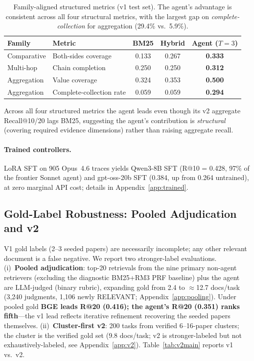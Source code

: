 \documentclass{article}
\begin{document}
\begin{table}[t]
\centering
\caption{Family-aligned structured metrics (v1 test set). The agent's advantage is consistent across all four structural metrics, with the largest gap on \emph{complete-collection} for aggregation (29.4\% vs.\ 5.9\%).}
\label{tab:familystruct}
\small
\begin{tabular}{llccc}
\toprule
\textbf{Family} & \textbf{Metric} & \textbf{BM25} & \textbf{Hybrid} & \textbf{Agent ($T{=}3$)} \\
\midrule
Comparative  & Both-sides coverage      & 0.133 & 0.267 & \textbf{0.333} \\
Multi-hop    & Chain completion         & 0.250 & 0.250 & \textbf{0.312} \\
Aggregation  & Value coverage           & 0.324 & 0.353 & \textbf{0.500} \\
Aggregation  & Complete-collection rate & 0.059 & 0.059 & \textbf{0.294} \\
\bottomrule
\end{tabular}
\end{table}

Across all four structured metrics the agent leads even though its v2 aggregate Recall@10/20 lags BM25, suggesting the agent's contribution is \emph{structural} (covering required evidence dimensions) rather than raising aggregate recall.

\paragraph{Trained controllers.} LoRA SFT on 905 Opus~4.6 traces yields Qwen3-8B SFT (R@10 = 0.428, 97\% of the frontier Sonnet agent) and gpt-oss-20b SFT (0.384, up from 0.264 untrained), at zero marginal API cost; details in Appendix~\ref{app:trained}.

\subsection{Gold-Label Robustness: Pooled Adjudication and v2}
\label{sec:goldrobust}

V1 gold labels (2--3 seeded papers) are necessarily incomplete; any other relevant document is a false negative. We report two stronger-label evaluations. (i)~\textbf{Pooled adjudication}: top-20 retrievals from the nine primary non-agent retrievers (excluding the diagnostic BM25+RM3 PRF baseline) plus the agent are LLM-judged (binary rubric), expanding gold from 2.4 to $\approx$12.7 docs/task (3{,}240 judgments, 1{,}106 newly RELEVANT; Appendix~\ref{app:pooling}). Under pooled gold \textbf{BGE leads R@20 (0.416); the agent's R@20 (0.351) ranks fifth}---the v1 lead reflects iterative refinement recovering the seeded papers themselves. (ii)~\textbf{Cluster-first v2}: 200 tasks from verified 6--16-paper clusters; the cluster is the verified gold set (9.8 docs/task; v2 is stronger-labeled but not exhaustively-labeled, see Appendix~\ref{app:v2}). Table~\ref{tab:v2main} reports v1 vs.\ v2.
\end{document}
